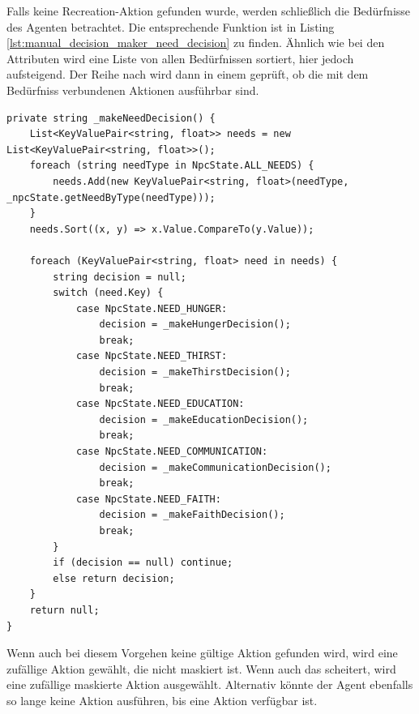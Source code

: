 Falls keine Recreation-Aktion gefunden wurde, werden schließlich die Bedürfnisse des Agenten betrachtet. Die entsprechende Funktion ist in Listing \ref{lst:manual_decision_maker_need_decision} zu finden. Ähnlich wie bei den Attributen wird eine Liste von allen Bedürfnissen sortiert, hier jedoch aufsteigend. Der Reihe nach wird dann in einem  geprüft, ob die mit dem Bedürfniss verbundenen Aktionen ausführbar sind.

\begin{minipage}{\linewidth}
\begin{lstlisting}[linewidth=16.4cm, label=lst:manual_decision_maker_need_decision, caption=Funktion \inlinecode{makeNeedDecision} im \inlinecode{ManualDecisionMaker}, xleftmargin=1cm, basicstyle=\footnotesize]
private string _makeNeedDecision() {
    List<KeyValuePair<string, float>> needs = new List<KeyValuePair<string, float>>();
    foreach (string needType in NpcState.ALL_NEEDS) {
        needs.Add(new KeyValuePair<string, float>(needType, _npcState.getNeedByType(needType)));
    }
    needs.Sort((x, y) => x.Value.CompareTo(y.Value));

    foreach (KeyValuePair<string, float> need in needs) {
        string decision = null;
        switch (need.Key) {
            case NpcState.NEED_HUNGER:
                decision = _makeHungerDecision();
                break;
            case NpcState.NEED_THIRST:
                decision = _makeThirstDecision();
                break;
            case NpcState.NEED_EDUCATION:
                decision = _makeEducationDecision();
                break;
            case NpcState.NEED_COMMUNICATION:
                decision = _makeCommunicationDecision();
                break;
            case NpcState.NEED_FAITH:
                decision = _makeFaithDecision();
                break;
        }
        if (decision == null) continue;
        else return decision;
    }
    return null;
}
\end{lstlisting}
\end{minipage}

Wenn auch bei diesem Vorgehen keine gültige Aktion gefunden wird, wird eine zufällige Aktion gewählt, die nicht maskiert ist. Wenn auch das scheitert, wird eine zufällige maskierte Aktion ausgewählt. Alternativ könnte der Agent ebenfalls so lange keine Aktion ausführen, bis eine Aktion verfügbar ist.







